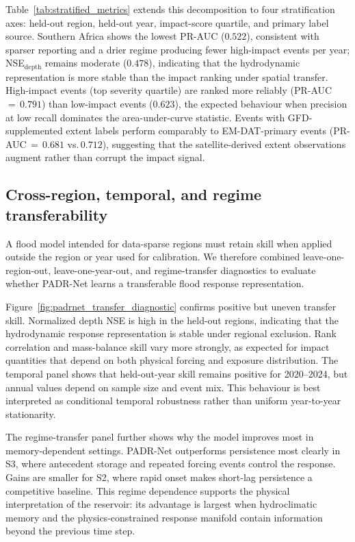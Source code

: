 \documentclass[pdflatex,sn-mathphys-ay]{sn-jnl}
\theoremstyle{thmstyleone}
\begin{document}
Table~\ref{tab:stratified_metrics} extends this decomposition to four
stratification axes: held-out region, held-out year, impact-score
quartile, and primary label source.  Southern Africa shows the lowest
PR-AUC ($0.522$), consistent with sparser reporting and a drier regime
producing fewer high-impact events per year; NSE$_{\mathrm{depth}}$
remains moderate ($0.478$), indicating that the hydrodynamic
representation is more stable than the impact ranking under spatial
transfer.  High-impact events (top severity quartile) are ranked more
reliably (PR-AUC\,$=\,0.791$) than low-impact events ($0.623$),
the expected behaviour when precision at low recall dominates the
area-under-curve statistic.  Events with GFD-supplemented extent
labels perform comparably to EM-DAT-primary events (PR-AUC\,$=\,0.681$
vs.\,$0.712$), suggesting that the satellite-derived extent observations
augment rather than corrupt the impact signal.

\subsection{Cross-region, temporal, and regime transferability}
\label{subsec:transfer_diagnostics_results}

A flood model intended for data-sparse regions must retain skill when
applied outside the region or year used for calibration.  We therefore
combined leave-one-region-out, leave-one-year-out, and regime-transfer
diagnostics to evaluate whether PADR-Net learns a transferable flood
response representation.

Figure~\ref{fig:padrnet_transfer_diagnostic} confirms positive but
uneven transfer skill.  Normalized depth NSE is high in the held-out
regions, indicating that the hydrodynamic response representation is
stable under regional exclusion.  Rank correlation and mass-balance
skill vary more strongly, as expected for impact quantities that depend
on both physical forcing and exposure distribution.  The temporal panel
shows that held-out-year skill remains positive for 2020--2024, but
annual values depend on sample size and event mix.  This behaviour is
best interpreted as conditional temporal robustness rather than uniform
year-to-year stationarity.

The regime-transfer panel further shows why the model improves most in
memory-dependent settings.  PADR-Net outperforms persistence most
clearly in S3, where antecedent storage and repeated forcing events
control the response.  Gains are smaller for S2, where rapid onset
makes short-lag persistence a competitive baseline.  This regime
dependence supports the physical interpretation of the reservoir: its
advantage is largest when hydroclimatic memory and the
physics-constrained response manifold contain information beyond the
previous time step.
\end{document}
